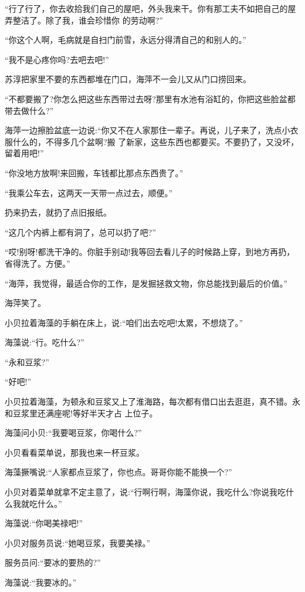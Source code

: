 \documentclass[11pt,a4paper,onecolumn]{article}
\begin{document}
``行了行了，你去收拾我们自己的屋吧，外头我来干。你有那工夫不如把自己的屋弄整洁了。除了我，谁会珍惜你
的劳动啊?''

``你这个人啊，毛病就是自扫门前雪，永远分得清自己的和别人的。''

``我不是心疼你吗?去吧去吧!''

苏淳把家里不要的东西都堆在门口，海萍不一会儿又从门口捞回来。

``不都要搬了?你怎么把这些东西带过去呀?那里有水池有浴缸的，你把这些脸盆都带去做什么?''

海萍一边擦脸盆底一边说:``你又不在人家那住一辈子。再说，儿子来了，洗点小衣服什么的，不得多几个盆啊?搬
了新家，这些东西也都要买。不要扔了，又没坏，留着用吧!''

``你没地方放啊!来回搬，车钱都比那点东西贵了。''

``我乘公车去，这两天一天带一点过去，顺便。''

扔来扔去，就扔了点旧报纸。

``这几个内裤上都有洞了，总可以扔了吧?''

``哎!别呀!都洗干净的。你脏手别动!我等回去看儿子的时候路上穿，到地方再扔，省得洗了。方便。''

``海萍，我觉得，最适合你的工作，是发掘拯救文物，你总能找到最后的价值。''

海萍笑了。

小贝拉着海藻的手躺在床上，说:``咱们出去吃吧!太累，不想烧了。''

海藻说:``行。吃什么?''

``永和豆浆?''

``好吧!''

小贝拉着海藻，为顿永和豆浆又上了淮海路，每次都有借口出去逛逛，真不错。永和豆浆里还满座呢!等好半天才占
上位子。

海藻问小贝:``我要喝豆浆，你喝什么?''

小贝看看菜单说，那我也来一杯豆浆。

海藻撅嘴说:``人家都点豆浆了，你也点。哥哥你能不能换一个?''

小贝对着菜单就拿不定主意了，说:``行啊行啊，海藻你说，我吃什么?你说我吃什么我就吃什么。''

海藻说:``你喝美禄吧!''

小贝对服务员说:``她喝豆浆，我要美禄。''

服务员问:``要冰的要热的?''

海藻说:``我要冰的。''

\section[\thesection]{}
\end{document}
